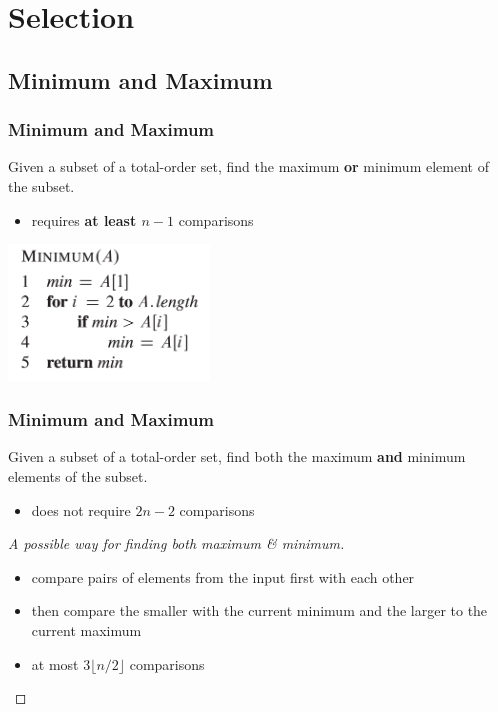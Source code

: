 \documentclass[UTF8,11pt,handout]{beamer}
\begin{document}
\section{Selection}
\subsection{Minimum and Maximum}
\begin{frame}
\frametitle{Minimum and Maximum}
\begin{center}
	\begin{problem}
		Given a subset of a total-order set, find the maximum \textbf{or} minimum element of the subset. 
		\begin{itemize}
			\item requires \textbf{\color{blue}at least $n-1$} comparisons
		\end{itemize}
	\end{problem}
	\includegraphics[width=0.4\textwidth]{figs/minimum_procedure.png}
\end{center}
\end{frame}
\begin{frame}
\frametitle{Minimum and Maximum}
\begin{center}
	
	\begin{problem}
		Given a subset of a total-order set, find both the maximum \textbf{and} minimum elements of the subset. 
		\begin{itemize}
			\item does not require $2n-2$ comparisons
		\end{itemize}
	\end{problem}

\pause	\begin{proof}[A possible way for finding both maximum \& minimum]
		 \begin{itemize}
		 	\item  compare pairs of elements from the input first with each other
		 	\item then compare the smaller with the current minimum and the larger to the current maximum
		 	\item at most $3\lfloor n/2\rfloor$ comparisons
		 \end{itemize}
		
	\end{proof}
\end{center}
\end{frame}
\end{document}
